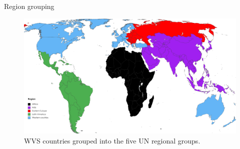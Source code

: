\documentclass[aspectratio=169,xcolor=dvipsnames, 11pt,mathserif]{beamer}
\begin{document}
\begin{frame}{Region grouping}
    \begin{figure}
        \caption{WVS countries grouped into the five UN regional groups.}  
        \centering \includegraphics[height=.8\textheight]{../figures/region_groupings} %
    \end{figure}
\end{frame}

              
\end{document}
